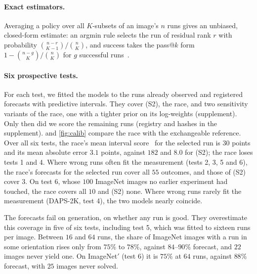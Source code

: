 \paragraph{Exact estimators.}
Averaging a policy over all $K$-subsets of an image's $n$ runs gives an unbiased, closed-form estimate: an argmin rule selects the run of residual rank $r$ with probability $\binom{n-r}{K-1}/\binom nK$, and success takes the pass@$k$ form $1-\binom{n-g}{K}/\binom nK$ for $g$ successful runs~\cite{chen2021codex}.

\paragraph{Six prospective tests.}
For each test, we fitted the models to the runs already observed and registered forecasts with predictive intervals.
They cover (S2), the race, and two sensitivity variants of the race, one with a tighter prior on its log-weights (supplement).
Only then did we score the remaining runs (registry and hashes in the supplement).
 and \cref{fig:calib} compare the race with the exchangeable reference.
Over all six tests, the race's mean interval score~\cite{gneiting2007scoring} for the selected run is $30$ points and its mean absolute error $3.1$ points, against $182$ and $8.0$ for (S2); the race loses tests 1 and 4.
Where wrong runs often fit the measurement (tests 2, 3, 5 and 6), the race's forecasts for the selected run cover all $55$ outcomes, and those of (S2) cover $3$.
On test 6, whose $100$ ImageNet images no earlier experiment had touched, the race covers all $10$ and (S2) none.
Where wrong runs rarely fit the measurement (DAPS-2K, test 4), the two models nearly coincide.

The forecasts fail on generation, \ie on whether any run is good.
They overestimate this coverage in five of six tests, including test 5, which was fitted to sixteen runs per image.
Between $16$ and $64$ runs, the share of ImageNet images with a \good run in some orientation rises only from $75\%$ to $78\%$, against $84$--$90\%$ forecast, and $22$ images never yield one.
On ImageNet$'$ (test 6) it is $75\%$ at $64$ runs, against $88\%$ forecast, with $25$ images never solved.

